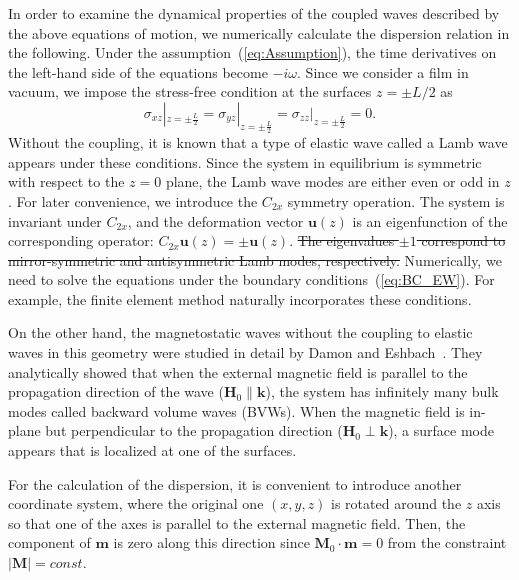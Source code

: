 \documentclass[10pt]{iopart}
\providecommand{\DIFdeltex}[1]{{\protect\color{red}\sout{#1}}}                      %
\providecommand{\DIFdelbegin}{} %
\providecommand{\DIFdelend}{} %
\providecommand{\DIFdel}[1]{\texorpdfstring{\DIFdeltex{#1}}{}} %
\newcommand{\DIFscaledelfig}{0.5}
\newlength{\DIFdelgraphicswidth} %
\newlength{\DIFdelgraphicsheight} %
\newcommand{\DIFdelincludegraphics}[2][]{%
\sbox{\DIFdelgraphicsbox}{\DIFOincludegraphics[#1]{#2}}%
\settoboxwidth{\DIFdelgraphicswidth}{\DIFdelgraphicsbox} %
\settoboxtotalheight{\DIFdelgraphicsheight}{\DIFdelgraphicsbox} %
\scalebox{\DIFscaledelfig}{%
\parbox[b]{\DIFdelgraphicswidth}{\usebox{\DIFdelgraphicsbox}\\[-\baselineskip] \rule{\DIFdelgraphicswidth}{0em}}\llap{\resizebox{\DIFdelgraphicswidth}{\DIFdelgraphicsheight}{%
\setlength{\unitlength}{\DIFdelgraphicswidth}%
\begin{picture}(1,1)%
\thicklines\linethickness{2pt} %
{\color[rgb]{1,0,0}\put(0,0){\framebox(1,1){}}}%
{\color[rgb]{1,0,0}\put(0,0){\line( 1,1){1}}}%
{\color[rgb]{1,0,0}\put(0,1){\line(1,-1){1}}}%
\end{picture}%
}\hspace*{3pt}}} %
} %
\DeclareRobustCommand{\DIFdelbegin}{\DIFOdelbegin \let\includegraphics\DIFdelincludegraphics} %
\DeclareRobustCommand{\DIFdelend}{\DIFOaddend \let\includegraphics\DIFOincludegraphics} %
\begin{document}
In order to examine the dynamical properties of the coupled waves described by the above equations of motion, we numerically calculate the dispersion relation in the following. Under the assumption~(\ref{eq:Assumption}), the time derivatives on the left-hand side of the equations become $-i\omega$. Since we consider a film in vacuum, we impose the stress-free condition at the surfaces $z=\pm L/2$ as
\begin{equation}
    \sigma_{xz}|_{z=\pm\frac{L}{2}}=\sigma_{yz}|_{z=\pm\frac{L}{2}}=\sigma_{zz}|_{z=\pm\frac{L}{2}}=0.\label{eq:BC_EW}
\end{equation}
Without the coupling, it is known that a type of elastic wave called a Lamb wave appears under these conditions. Since the system in equilibrium is symmetric with respect to the $z=0$ plane, the Lamb wave modes are either even or odd in $z$. For later convenience, we introduce the $C_{2x}$ symmetry operation. The system is invariant under $C_{2x}$, and the deformation vector $\bm{u}(z)$ is an eigenfunction of the corresponding operator: $C_{2x}\bm{u}(z)=\pm\bm{u}(z)$. \DIFdelbegin \DIFdel{The eigenvalues $\pm 1$ correspond to mirror-symmetric and antisymmetric Lamb modes, respectively. }\DIFdelend Numerically, we need to solve the equations under the boundary conditions~(\ref{eq:BC_EW}). For example, the finite element method naturally incorporates these conditions.

On the other hand, the magnetostatic waves without the coupling to elastic waves in this geometry were studied in detail by Damon and Eshbach~\cite{damoneshbachMagnetostaticModesFerromagnet1961}. They analytically showed that when the external magnetic field is parallel to the propagation direction of the wave ($\bm{H}_0\parallel\bm{k}$), the system has infinitely many bulk modes called backward volume waves (BVWs). When the magnetic field is in-plane but perpendicular to the propagation direction ($\bm{H}_0\perp\bm{k}$), a surface mode appears that is localized at one of the surfaces.

For the calculation of the dispersion, it is convenient to introduce another coordinate system, where the original one $(x,y,z)$ is rotated around the $z$ axis so that one of the axes is parallel to the external magnetic field. Then, the component of $\bm{m}$ is zero along this direction since $\bm{M}_0\cdot\bm{m}=0$ from the constraint $|\bm{M}|=const.$
\end{document}
